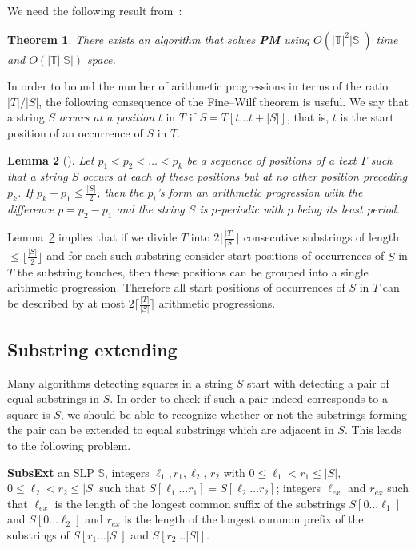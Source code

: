 \documentclass[11pt]{article}
\newtheorem{thm}{Theorem}[section]
\theoremstyle{break}
\newtheorem{lem}[thm]{Lemma}
\newcommand{\slp}[1]{\mathbb{#1}}
\newcommand{\substr}[2]{[#1\dots#2]}
\newcommand{\problem}[3]{\smallskip
            \noindent {\sc Problem:} \textbf{#1} \newline
            \noindent {\sc Input:} #2 \newline
            \noindent {\sc Output:} #3
\smallskip}
\begin{document}
We need the following result from~\cite{15}:
\begin{thm}
There exists an algorithm that solves \textbf{PM} using $O(|\slp{T}|^2|\slp{S}|)$ time and $O(|\slp{T}||\slp{S}|)$ space.
\end{thm}

In order to bound the number of arithmetic progressions in terms of the ratio $|T|/|S|$, the following consequence of the Fine--Wilf
theorem is useful. We say that a string $S$ \emph{occurs at a position} $t$ in $T$ if $S=T[t\dots t+|S|]$, that is, $t$ is the start
position of an occurrence of $S$ in $T$.

\begin{lem}[\!]
\label{lem:blocks} Let $p_1 < p_2 < \dots < p_k$ be a sequence of positions of a text $T$ such that a string $S$ occurs at each of these
positions but at no other position preceding $p_k$. If $p_k-p_1\le\frac{|S|}{2}$, then the $p_i$'s form an arithmetic progression with the
difference $p=p_2-p_1$ and the string $S$ is $p$-periodic with $p$ being its least period.
\end{lem}

Lemma~\ref{lem:blocks} implies that if we divide $T$ into $2\lceil\frac{|T|}{|S|}\rceil$ consecutive substrings of length
$\le\lfloor\frac{|S|}{2}\rfloor$ and for each such substring consider start positions of occurrences of $S$ in $T$ the substring touches,
then these positions can be grouped into a single arithmetic progression. Therefore all start positions of occurrences of $S$ in $T$ can be
described by at most $2\lceil\frac{|T|}{|S|}\rceil$ arithmetic progressions.

\subsection{Substring extending}

Many algorithms detecting squares in a string $S$ start with detecting a pair of equal substrings in $S$. In order to check if such a pair
indeed corresponds to a square is $S$, we should be able to recognize whether or not the substrings forming the pair can be extended to
equal substrings which are adjacent in $S$. This leads to the following problem.

\problem{SubsExt}{an SLP $\slp{S}$, integers $\ell_1, r_1, \ell_2$, $r_2$ with $0 \le \ell_1 < r_1 \le|S|$, $0 \le \ell_2 < r_2 \le|S|$
such that $S\substr{\ell_1}{r_1} = S\substr{\ell_2}{r_2}$;}{integers $\ell_{ex}$ and $r_{ex}$ such that $\ell_{ex}$ is the length of the
longest common suffix of the substrings $S\substr{0}{\ell_1}$ and $S\substr{0}{\ell_2}$ and $r_{ex}$ is the length of the longest common
prefix of the substrings of $S\substr{r_1}{|S|}$ and $S\substr{r_2}{|S|}$.}
\end{document}
